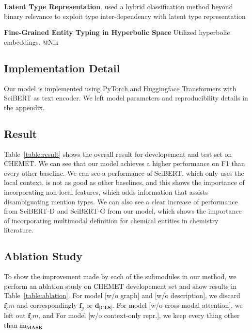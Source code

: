 
\noindent \textbf{Latent Type Representation}. \citet{lin2019attentive} used a hybrid classification method beyond binary relevance to exploit type inter-dependency with latent type representation

\noindent \textbf{Fine-Grained Entity Typing in Hyperbolic Space
} Utilized hyperbolic embeddings. @Nik







\subsection{Implementation Detail}

Our model is implemented using PyTorch \cite{pytorch} and Huggingface Transformers \cite{huggingface} with SciBERT as text encoder. We left model parameters and reproducibility details in the appendix. 

\subsection{Result}
Table~\ref{table:result} shows the overall result for developement and test set on CHEMET. We can see that our model achieves a higher performance on F1 than every other baseline. We can see a performance of SciBERT, which only uses the local context, is not as good as other baselines, and this shows the importance of incorporating non-local features, which adds information that assists disambiguating mention types. We can also see a clear increase of performance from SciBERT-D and SciBERT-G from our model, which shows the importance of incorporating multimodal definition for chemical entities in chemistry literature.

\subsection{Ablation Study}
To show the improvement made by each of the submodules in our method, we perform an ablation study on CHEMET developement set and show results in Table~\ref{table:ablation}. For model [w/o graph] and [w/o description], we discard $\mathbf{f}_cm$ and correspondingly $\mathbf{f}_g$ or $\mathbf{d}_\textbf{[CLS]}$. For model [w/o cross-modal attention], we left out $\mathbf{f}_cm$, and For model [w/o context-only repr.], we keep every thing other than $\mathbf{\mathbf{m}_\text{MASK}}$

